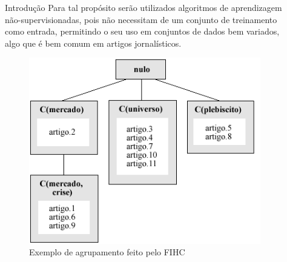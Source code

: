 \documentclass[final]{beamer}
\newlength{\sepwid}
\newlength{\onecolwid}
\newlength{\twocolwid}
\begin{document}
\begin{frame}[t]
\begin{columns}[t]
\begin{column}{\onecolwid}
\begin{block}{Introdução}
Para tal propósito serão utilizados algoritmos de aprendizagem não-supervisionadas, pois não necessitam de um conjunto de treinamento como entrada, permitindo o seu uso em conjuntos de dados bem variados, algo que é bem comum em artigos jornalísticos.

\end{block}


\begin{figure}
\includegraphics[width=0.75\linewidth]{fihc.png}
\caption{Exemplo de agrupamento feito pelo FIHC}
\end{figure}


\end{column} %

\begin{column}{\sepwid}\end{column} %

\begin{column}{\twocolwid} %

\begin{columns}[t,totalwidth=\twocolwid] %

\begin{column}{\onecolwid}\vspace{-.6in} %



\end{column}
\end{columns}
\end{column}
\end{columns}
\end{frame}
\end{document}
